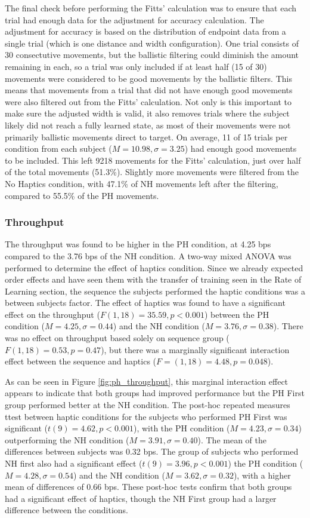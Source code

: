 The final check before performing the Fitts' calculation was to ensure that each trial had enough data for the adjustment for accuracy calculation.
The adjustment for accuracy is based on the distribution of endpoint data from a single trial (which is one distance and width configuration).
One trial consists of 30 consectutive movements, but the ballistic filtering could diminish the amount remaining in each, so a trial was only included if at least half (15 of 30) movements were considered to be good movements by the ballistic filters.
This means that movements from a trial that did not have enough good movements were also filtered out from the Fitts' calculation.
Not only is this important to make sure the adjusted width is valid, it also removes trials where the subject likely did not reach a fully learned state, as most of their movements were not primarily ballistic movements direct to target.
On average, 11 of 15 trials per condition from each subject ($M=10.98, \sigma=3.25$) had enough good movements to be included.
This left 9218 movements for the Fitts' calculation, just over half of the total movements (51.3\%).
Slightly more movements were filtered from the No Haptics condition, with 47.1\% of NH movements left after the filtering, compared to 55.5\% of the PH movements.

\subsubsection{Throughput}

The throughput was found to be higher in the PH condition, at 4.25 bps compared to the 3.76 bps of the NH condition.
A two-way mixed ANOVA was performed to determine the effect of haptics condition.
Since we already expected order effects and have seen them with the transfer of training seen in the Rate of Learning section, the sequence the subjects performed the haptic conditions was a between subjects factor.
The effect of haptics was found to have a significant effect on the throughput ($F(1,18)=35.59, p<0.001$) between the PH condition ($M=4.25, \sigma=0.44$) and the NH condition ($M=3.76, \sigma=0.38$).
There was no effect on throughput based solely on sequence group ($F(1,18)=0.53, p=0.47$), but there was a marginally significant interaction effect between the sequence and haptics ($F=(1,18)=4.48, p=0.048$).

As can be seen in Figure \ref{fig:ph_throughput}, this marginal interaction effect appears to indicate that both groups had improved performance but the PH First group performed better at the NH condition.
The post-hoc repeated measures ttest between haptic conditions for the subjects who performed PH First was significant ($t(9)=4.62, p<0.001$), with the PH condition ($M=4.23, \sigma=0.34$) outperforming the NH condition ($M=3.91, \sigma=0.40$).
The mean of the differences between subjects was 0.32 bps.
The group of subjects who performed NH first also had a significant effect ($t(9)=3.96, p<0.001$) the PH condition ($M=4.28, \sigma=0.54$) and the NH condition ($M=3.62, \sigma=0.32$), with a higher mean of differences of 0.66 bps.
These post-hoc tests confirm that both groups had a significant effect of haptics, though the NH First group had a larger difference between the conditions.

